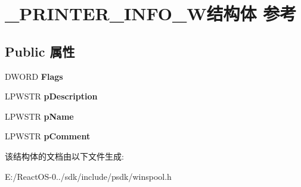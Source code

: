 \hypertarget{struct___p_r_i_n_t_e_r___i_n_f_o__1_w}{}\section{\+\_\+\+P\+R\+I\+N\+T\+E\+R\+\_\+\+I\+N\+F\+O\+\_\+W结构体 参考}
\label{struct___p_r_i_n_t_e_r___i_n_f_o__1_w}
\subsection*{Public 属性}
\begin{DoxyCompactItemize}
\item 
\mbox{\label{struct___p_r_i_n_t_e_r___i_n_f_o__1_w_a6461abc011f74bf18455156f1ccaa557}} 
D\+W\+O\+RD {\bfseries Flags}
\item 
\mbox{\label{struct___p_r_i_n_t_e_r___i_n_f_o__1_w_aea65fb00caa9ea71ad1044477c154ddc}} 
L\+P\+W\+S\+TR {\bfseries p\+Description}
\item 
\mbox{\label{struct___p_r_i_n_t_e_r___i_n_f_o__1_w_a542ec393d516b918034424c4e6f3189d}} 
L\+P\+W\+S\+TR {\bfseries p\+Name}
\item 
\mbox{\label{struct___p_r_i_n_t_e_r___i_n_f_o__1_w_abdff04fd18ca8b2545db27eca48e7a63}} 
L\+P\+W\+S\+TR {\bfseries p\+Comment}
\end{DoxyCompactItemize}


该结构体的文档由以下文件生成\+:\begin{DoxyCompactItemize}
\item 
E\+:/\+React\+O\+S-\/0../sdk/include/psdk/winspool.\+h\end{DoxyCompactItemize}

